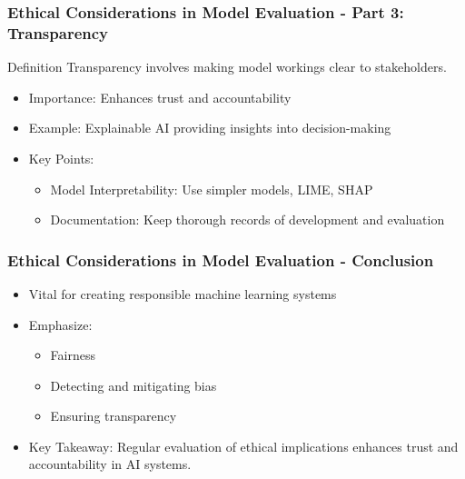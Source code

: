 \documentclass[aspectratio=169]{beamer}
\begin{document}
\begin{frame}[fragile]
    \frametitle{Ethical Considerations in Model Evaluation - Part 3: Transparency}
    \begin{block}{Definition}
        Transparency involves making model workings clear to stakeholders.
    \end{block}
    \begin{itemize}
        \item Importance: Enhances trust and accountability
        \item Example: Explainable AI providing insights into decision-making
        \item Key Points:
            \begin{itemize}
                \item Model Interpretability: Use simpler models, LIME, SHAP
                \item Documentation: Keep thorough records of development and evaluation
            \end{itemize}
    \end{itemize}
\end{frame}

\begin{frame}[fragile]
    \frametitle{Ethical Considerations in Model Evaluation - Conclusion}
    \begin{itemize}
        \item Vital for creating responsible machine learning systems
        \item Emphasize:
            \begin{itemize}
                \item Fairness
                \item Detecting and mitigating bias
                \item Ensuring transparency
            \end{itemize}
        \item Key Takeaway: Regular evaluation of ethical implications enhances trust and accountability in AI systems.
    \end{itemize}
\end{frame}
\end{document}
